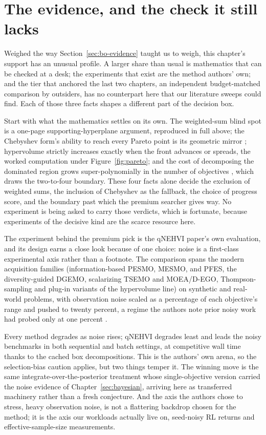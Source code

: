 \section{The evidence, and the check it still lacks}
\label{sec:mo-evidence}

Weighed the way Section~\ref{sec:bo-evidence} taught us to weigh, this
chapter's support has an unusual profile. A larger share than usual is
mathematics that can be checked at a desk; the experiments that exist
are the method authors' own; and the tier that anchored the last two
chapters, an independent budget-matched comparison by outsiders, has no
counterpart here that our literature sweeps could find. Each of those
three facts shapes a different part of the decision box.

Start with what the mathematics settles on its own. The weighted-sum
blind spot is a one-page supporting-hyperplane argument, reproduced in
full above; the Chebyshev form's ability to reach every Pareto point is
its geometric mirror \citep{karl2023moo}; hypervolume strictly
increases exactly when the front advances or spreads, the worked
computation under Figure~\ref{fig:pareto}; and the cost of decomposing
the dominated region grows super-polynomially in the number of
objectives \citep{daulton2021qnehvi}, which draws the two-to-four
boundary. These four facts alone decide the exclusion of weighted
sums, the inclusion of Chebyshev as the fallback, the choice of
progress score, and the boundary past which the premium searcher
gives way. No experiment is being asked to carry those verdicts,
which is fortunate, because experiments of the decisive kind are the
scarce resource here.

The experiment behind the premium pick is the qNEHVI paper's own
evaluation, and its design earns a close look because of one choice:
noise is a first-class experimental axis rather than a footnote. The
comparison spans the modern acquisition families (information-based
PESMO, MESMO, and PFES, the diversity-guided DGEMO, scalarizing
TSEMO and MOEA/D-EGO, Thompson-sampling and plug-in variants of the
hypervolume line) on synthetic and real-world problems, with
observation noise scaled as a percentage of each objective's range
and pushed to twenty percent, a regime the authors note prior noisy
work had probed only at one percent \citep{daulton2021qnehvi}.

Every
method degrades as noise rises; qNEHVI degrades least and leads the
noisy benchmarks in both sequential and batch settings, at
competitive wall time thanks to the cached box decompositions. This
is the authors' own arena, so the selection-bias caution applies, but
two things temper it. The winning move is the same
integrate-over-the-posterior treatment whose single-objective version
carried the noise evidence of Chapter~\ref{sec:bayesian}, arriving
here as transferred machinery rather than a fresh conjecture. And the
axis the authors chose to stress, heavy observation noise, is not a
flattering backdrop chosen for the method; it is the axis our
workloads actually live on, seed-noisy RL returns and
effective-sample-size measurements.

